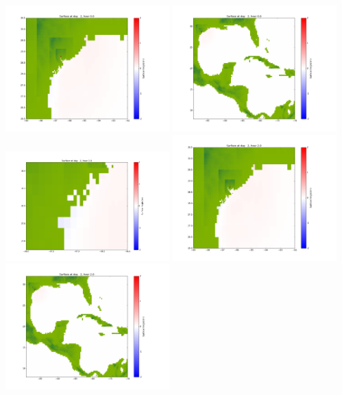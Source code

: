 \documentclass[11pt]{article}
\begin{document}
\includegraphics[width=0.475\textwidth]{frame0048fig1002.png}
\vskip 10pt 
\includegraphics[width=0.475\textwidth]{frame0048fig1003.png}
\vskip 10pt 
\includegraphics[width=0.475\textwidth]{frame0049fig1001.png}
\includegraphics[width=0.475\textwidth]{frame0049fig1002.png}
\vskip 10pt 
\includegraphics[width=0.475\textwidth]{frame0049fig1003.png}
\end{document}
